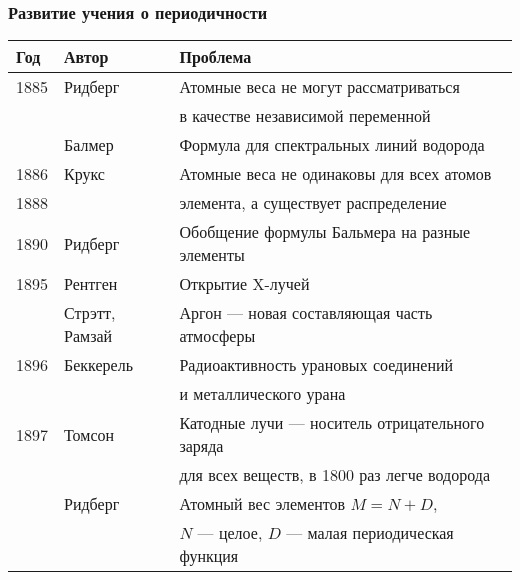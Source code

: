 \begin{frame}
\frametitle{Развитие учения о периодичности}
{\small	
	\begin{tabular}{l|l|l}
		Год & Автор	& Проблема \\
		\hline
		1885 & Ридберг & {\color{red}Атомные веса не могут рассматриваться} \\
		~ & ~ & {\color{red} в качестве независимой переменной} \\	
		~ & Балмер & Формула для спектральных линий водорода \\	
		1886 & Крукс & {\color{red}Атомные веса не одинаковы для всех атомов } \\
		1888 & ~ &   {\color{red}элемента, а существует распределение }\\
		1890 & Ридберг & Обобщение формулы Бальмера на разные элементы \\	
		1895 & Рентген & Открытие X-лучей \\
		~ & Стрэтт, Рамзай & Аргон --- новая составляющая часть атмосферы \\
		1896 & Беккерель & Радиоактивность урановых соединений  \\
		~ & ~ &  и металлического урана\\
		1897 & Томсон & Катодные лучи --- носитель отрицательного заряда  \\
		~ & ~ &  для всех веществ, в 1800 раз легче водорода\\	
		~ & Ридберг & {\color{red}Атомный вес элементов $M = N+D$,} \\	
		~ & ~ &  {\color{red}$N$ --- целое, $D$ --- малая периодическая функция}\\			
		\hline
	\end{tabular}
}	
\end{frame}



